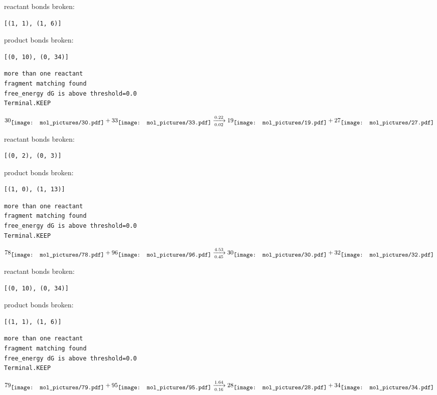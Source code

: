 \documentclass{article}
\begin{document}
reactant bonds broken:\begin{verbatim}
[(1, 1), (1, 6)]
\end{verbatim}
product bonds broken:\begin{verbatim}
[(0, 10), (0, 34)]
\end{verbatim}




\vspace{1cm}
\begin{verbatim}
more than one reactant
fragment matching found
free_energy dG is above threshold=0.0
Terminal.KEEP
\end{verbatim}
$$
30
\raisebox{-.5\height}{\texttt{[image: mol\_pictures/30.pdf]}}
+
33
\raisebox{-.5\height}{\texttt{[image: mol\_pictures/33.pdf]}}
\xrightarrow[0.02]{0.22}
19
\raisebox{-.5\height}{\texttt{[image: mol\_pictures/19.pdf]}}
+
27
\raisebox{-.5\height}{\texttt{[image: mol\_pictures/27.pdf]}}
$$


reactant bonds broken:\begin{verbatim}
[(0, 2), (0, 3)]
\end{verbatim}
product bonds broken:\begin{verbatim}
[(1, 0), (1, 13)]
\end{verbatim}




\vspace{1cm}
\begin{verbatim}
more than one reactant
fragment matching found
free_energy dG is above threshold=0.0
Terminal.KEEP
\end{verbatim}
$$
78
\raisebox{-.5\height}{\texttt{[image: mol\_pictures/78.pdf]}}
+
96
\raisebox{-.5\height}{\texttt{[image: mol\_pictures/96.pdf]}}
\xrightarrow[0.45]{4.53}
30
\raisebox{-.5\height}{\texttt{[image: mol\_pictures/30.pdf]}}
+
32
\raisebox{-.5\height}{\texttt{[image: mol\_pictures/32.pdf]}}
$$


reactant bonds broken:\begin{verbatim}
[(0, 10), (0, 34)]
\end{verbatim}
product bonds broken:\begin{verbatim}
[(1, 1), (1, 6)]
\end{verbatim}




\vspace{1cm}
\begin{verbatim}
more than one reactant
fragment matching found
free_energy dG is above threshold=0.0
Terminal.KEEP
\end{verbatim}
$$
79
\raisebox{-.5\height}{\texttt{[image: mol\_pictures/79.pdf]}}
+
95
\raisebox{-.5\height}{\texttt{[image: mol\_pictures/95.pdf]}}
\xrightarrow[0.16]{1.64}
28
\raisebox{-.5\height}{\texttt{[image: mol\_pictures/28.pdf]}}
+
34
\raisebox{-.5\height}{\texttt{[image: mol\_pictures/34.pdf]}}
$$
\end{document}
